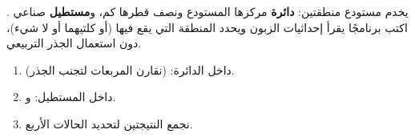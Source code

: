 \begin{statement}
يخدم مستودع منطقتين: \textbf{دائرة} مركزها المستودع  ونصف قطرها  كم، و\textbf{مستطيل} صناعي . اكتب برنامجًا يقرأ إحداثيات الزبون ويحدد المنطقة التي يقع فيها (أو كلتيهما أو لا شيء)، دون استعمال الجذر التربيعي.
\end{statement}
\begin{stepsbox}\begin{enumerate}
\item داخل الدائرة:  (نقارن المربعات لتجنب الجذر).
\item داخل المستطيل:  و.
\item نجمع النتيجتين لتحديد الحالات الأربع.
\end{enumerate}\end{stepsbox}
